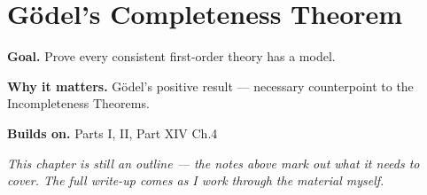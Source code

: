 \chapter{Gödel's Completeness Theorem}
\label{ch:14-metamathematics-05}

\begin{chapterintro}
\textbf{Goal.} Prove every consistent first-order theory has a model.

\textbf{Why it matters.} Gödel's positive result — necessary counterpoint to the Incompleteness Theorems.

\textbf{Builds on.} Parts I, II, Part XIV Ch.4
\end{chapterintro}

\textit{This chapter is still an outline --- the notes above mark out what it needs to cover. The full write-up comes as I work through the material myself.}
